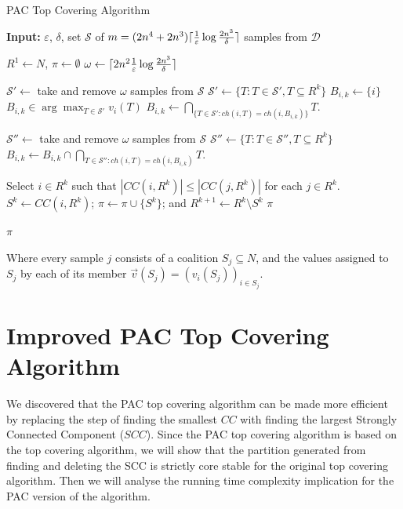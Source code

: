 \documentclass[letterpaper]{article} %
\DeclarePairedDelimiter\ceil{\lceil}{\rceil}
\renewcommand{\cal}[1]{\mathcal{#1}}
\newcommand{\eps}{\varepsilon}
\newcommand{\ch}{\mathit{ch}}
\newcommand{\samples}{\omega}
\begin{document}
\begin{algorithm}[htb]
  \caption{PAC Top Covering Algorithm}
  \label{alg:pac_top_covering}
  \textbf{Input:} $\eps$, $\delta$, set $\cal S$ of $m = (2n^4 + 2n^3)\ceil{\frac{1}{\eps}\log\frac{2n^3}{\delta}}$ samples from $\cal D$
  \begin{algorithmic}[1]

  \State $R^1 \gets N$, $\pi \gets \emptyset$
  \State $\samples \gets \ceil{2n^2 \frac{1}{\eps}\log\frac{2n^3}{\delta}}$

    \State $\cal S' \gets$ take and remove $\samples$ samples from $\cal S$
    \State $\cal S' \gets \{T: T \in \cal S', T \subseteq R^k\}$
      \If{$i \notin \bigcup_{X \in \cal S'} X$}
        \State$B_{i,k} \gets \{i\}$
      \Else
        \State $B_{i,k} \in \arg\max_{T \in \cal S'}{v_i(T)}$
        \State $B_{i,k} \gets \underset{\{T \in \cal S' : \ch(i,T) = \ch(i,B_{i,k})\}}{\bigcap} T$.
      \EndIf
    \EndFor

      \State $\cal S'' \gets$ take and remove $\samples$ samples from $\cal S$
      \State $\cal S'' \gets \{T: T \in \cal S'', T \subseteq R^k\}$
        \State $B_{i,k} \gets B_{i,k} \cap \underset{T \in \cal S'' : \ch(i,T) = \ch(i,B_{i,k})}{\bigcap} T$.
      \EndFor
    \EndFor

    \State Select $i\in R^k$ such that $|CC(i,R^k)| \leq |CC(j,R^k)|$ for each $j\in R^k$.
    \State $S^k\leftarrow  CC(i,R^k)$; $\pi \leftarrow  \pi \cup \lbrace S^k \rbrace$;  and $R^{k+1} \leftarrow  R^k \setminus S^k$
      \State \Return $\pi$
    \EndIf
  \EndFor

  \State \Return $\pi$
 \end{algorithmic}
\end{algorithm}

Where every sample $j$ consists of a coalition $S_j \subseteq N$, and the values assigned to $S_j$ by each of its member $\vec{v}(S_j) = (v_i(S_j))_{i \in S_j}$.

\section{Improved PAC Top Covering Algorithm}
We discovered that the PAC top covering algorithm can be made more efficient by replacing the step of finding the smallest $CC$ with finding the largest Strongly Connected Component ($SCC$). Since the PAC top covering algorithm is based on the top covering algorithm, we will show that the partition generated from finding and deleting the SCC is strictly core stable for the original top covering algorithm. Then we will analyse the running time complexity implication for the PAC version of the algorithm.
\end{document}
